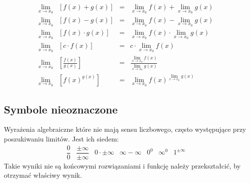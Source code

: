 \documentclass[14pt,a4paper]{extarticle}
\begin{document}
{%

\renewcommand{\arraystretch}{2}

\begin{equation*}
\begin{array}{rccc}
   \displaystyle\lim_{x \to x_{0}} & \displaystyle[f(x) + g(x)] & = & \displaystyle\lim_{x \to x_{0}}f(x) + \lim_{x \to x_{0}}g(x) \\
   \displaystyle\lim_{x \to x_{0}} & \displaystyle[f(x) - g(x)] & = & \displaystyle\lim_{x \to x_{0}}f(x) - \lim_{x \to x_{0}}g(x) \\
   \displaystyle\lim_{x \to x_{0}} & \displaystyle[f(x)\cdot g(x)] & = & \displaystyle\lim_{x \to x_{0}}f(x) \cdot \lim_{x \to x_{0}}g(x) \\
   \displaystyle\lim_{x \to x_{0}} & \displaystyle[c \cdot f(x)] & = & \displaystyle c \cdot \lim_{x \to x_{0}}f(x) \\
   \displaystyle\lim_{x \to x_{0}} & \displaystyle\left[\frac{f(x)}{g(x)}\right] & = & \displaystyle\frac{\displaystyle\lim_{x \to x_{0}}f(x)}{\displaystyle\lim_{x \to x_{0}}g(x)} \\
   \displaystyle\lim_{x \to x_{0}} & \displaystyle [f(x)^{g(x)}]& = & \displaystyle \lim_{x \to x_{0}}f(x)^{\lim\limits_{x \to x_{0}}g(x)}
\end{array}   
\end{equation*}

}%

\subsection{Symbole nieoznaczone}
\noindent Wyrażenia algebraiczne które nie mają sensu liczbowego, często występujące przy poszukiwaniu limitów.
Jest ich siedem:
\begin{equation*}
   \begin{array}{ccccccc}
      \dfrac{0}{0} & \dfrac{\pm\infty}{\pm\infty} & 0 \cdot \pm\infty & \infty - \infty & 0^{0} & \infty^{0} & 1^{\pm\infty}
   \end{array}
\end{equation*}
Takie wyniki nie są końcowymi rozwiązaniami i funkcję należy przekształcić, by otrzymać właściwy wynik.





\end{document}
